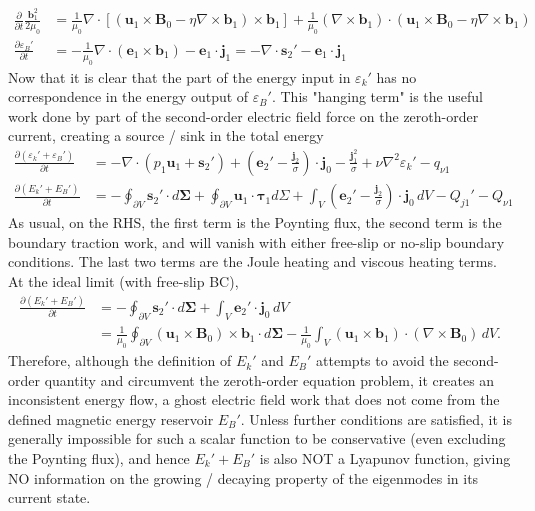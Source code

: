 %
\[
\begin{aligned}
    \frac{\partial}{\partial t} \frac{\mathbf{b}_1^2}{2 \mu_0} &= \frac{1}{\mu_0}\nabla\cdot \left[(\mathbf{u}_1\times \mathbf{B}_0 - \eta \nabla\times \mathbf{b}_1)\times \mathbf{b}_1\right] + \frac{1}{\mu_0}(\nabla\times \mathbf{b}_1)\cdot \left(\mathbf{u}_1\times \mathbf{B}_0 - \eta \nabla\times \mathbf{b}_1\right) \\ 
    \frac{\partial \varepsilon_B'}{\partial t} &= - \frac{1}{\mu_0}\nabla\cdot \left(\mathbf{e}_1\times \mathbf{b}_1 \right) - \mathbf{e}_1 \cdot \mathbf{j}_1 = - \nabla\cdot \mathbf{s}_2' - \mathbf{e}_1\cdot \mathbf{j}_1
\end{aligned}
\]
%
Now that it is clear that the part of the energy input in $\varepsilon_k'$ has no correspondence in the energy output of $\varepsilon_B'$. This "hanging term" is the useful work done by part of the second-order electric field force on the zeroth-order current, creating a source / sink in the total energy
%
\[\begin{aligned}
    \frac{\partial (\varepsilon_k' + \varepsilon_B')}{\partial t} &= - \nabla\cdot \left(p_1 \mathbf{u}_1 + \mathbf{s}_2' \right) + \left(\mathbf{e}_2' - \frac{\mathbf{j}_2}{\sigma}\right)\cdot \mathbf{j}_0 - \frac{\mathbf{j}_1^2}{\sigma} + \nu \nabla^2 \varepsilon_k' - q_{\nu 1} \\ 
    \frac{\partial (E_k' + E_B')}{\partial t} &= - \oint_{\partial V} \mathbf{s}_2' \cdot d\boldsymbol{\Sigma} + \oint_{\partial V} \mathbf{u}_1\cdot \boldsymbol{\tau}_1 d\Sigma + \int_V \left(\mathbf{e}_2' - \frac{\mathbf{j}_2}{\sigma}\right)\cdot \mathbf{j}_0 \, dV - Q_{j1}' - Q_{\nu 1}
\end{aligned}\]
%
As usual, on the RHS, the first term is the Poynting flux, the second term is the boundary traction work, and will vanish with either free-slip or no-slip boundary conditions. The last two terms are the Joule heating and viscous heating terms. At the ideal limit (with free-slip BC), 
%
\[\begin{aligned}
    \frac{\partial (E_k' + E_B')}{\partial t} &= - \oint_{\partial V} \mathbf{s}_2' \cdot d\boldsymbol{\Sigma} + \int_V \mathbf{e}_2'\cdot \mathbf{j}_0 \, dV \\
    &= \frac{1}{\mu_0} \oint_{\partial V} (\mathbf{u}_1 \times \mathbf{B}_0) \times \mathbf{b}_1 \cdot d\boldsymbol{\Sigma} - \frac{1}{\mu_0}\int_V (\mathbf{u}_1 \times \mathbf{b}_1)\cdot (\nabla\times \mathbf{B}_0) \, dV.
\end{aligned}\]
%
Therefore, although the definition of $E_k'$ and $E_B'$ attempts to avoid the second-order quantity and circumvent the zeroth-order equation problem, it creates an inconsistent energy flow, a ghost electric field work that does not come from the defined magnetic energy reservoir $E_B'$.
Unless further conditions are satisfied, it is generally impossible for such a scalar function to be conservative (even excluding the Poynting flux), and hence $E_k' + E_B'$ is also NOT a Lyapunov function, giving NO information on the growing / decaying property of the eigenmodes in its current state.
